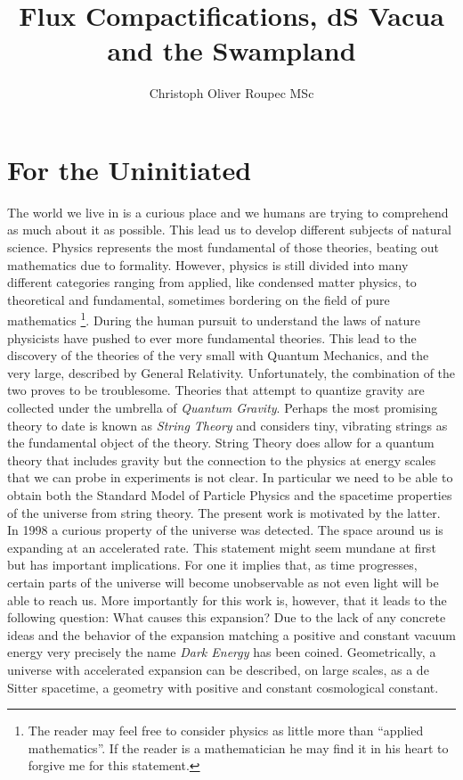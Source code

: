 \documentclass[12pt]{report}
\title{Flux Compactifications, dS Vacua and the Swampland}
\author{Christoph Oliver Roupec MSc}
\begin{document}
\pagestyle{myplain}
\setlength{\parindent}{0pt}
\renewcommand{\arraystretch}{1.2} %

\maketitle


\chapter{For the Uninitiated}
The world we live in is a curious place and we humans are trying to comprehend as much about it as possible. This lead us to develop different subjects of natural science. Physics represents the most fundamental of those theories, beating out mathematics due to formality. However, physics is still divided into many different categories ranging from applied, like condensed matter physics, to theoretical and fundamental, sometimes bordering on the field of pure mathematics \footnote{The reader may feel free to consider physics as little more than ``applied mathematics''. If the reader is a mathematician he may find it in his heart to forgive me for this statement.}. During the human pursuit to understand the laws of nature physicists have pushed to ever more fundamental theories. This lead to the discovery of the theories of the very small with Quantum Mechanics, and the very large, described by General Relativity. Unfortunately, the combination of the two proves to be troublesome. Theories that attempt to quantize gravity are collected under the umbrella of \emph{Quantum Gravity}. Perhaps the most promising theory to date is known as \emph{String Theory} and considers tiny, vibrating strings as the fundamental object of the theory. String Theory does allow for a quantum theory that includes gravity but the connection to the physics at energy scales that we can probe in experiments is not clear. In particular we need to be able to obtain both the Standard Model of Particle Physics and the spacetime properties of the universe from string theory. The present work is motivated by the latter.\\
In 1998 a curious property of the universe was detected. The space around us is expanding at an accelerated rate. This statement might seem mundane at first but has important implications. For one it implies that, as time  progresses, certain parts of the universe will become unobservable as not even light will be able to reach us. More importantly for this work is, however, that it leads to the following question: What causes this expansion? Due to the lack of any concrete ideas and the behavior of the expansion matching a positive and constant vacuum energy very precisely the name \emph{Dark Energy} has been coined. Geometrically, a universe with accelerated expansion can be described, on large scales, as a de Sitter spacetime, a geometry with positive and constant cosmological constant.\\
\end{document}
